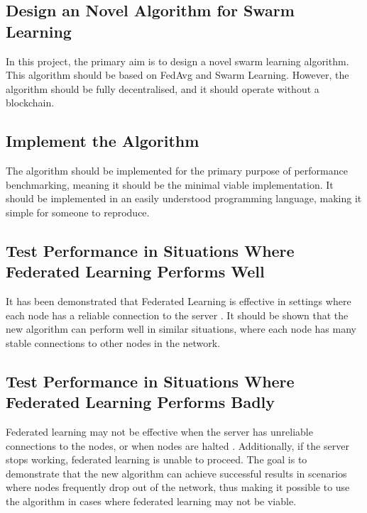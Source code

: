 \subsection{Design an Novel Algorithm for Swarm Learning}
In this project, the primary aim is to design a novel swarm learning algorithm. This algorithm should be based on FedAvg and Swarm Learning. However, the algorithm should be fully decentralised, and it should operate without a blockchain.

\subsection{Implement the Algorithm}
The algorithm should be implemented for the primary purpose of performance benchmarking, meaning it should be the minimal viable implementation. It should be implemented in an easily understood programming language, making it simple for someone to reproduce.

\subsection{Test Performance in Situations Where Federated Learning Performs Well}
It has been demonstrated that Federated Learning is effective in settings where each node has a reliable connection to the server \citeme. It should be shown that the new algorithm can perform well in similar situations, where each node has many stable connections to other nodes in the network.

\subsection{Test Performance in Situations Where Federated Learning Performs Badly}
Federated learning may not be effective when the server has unreliable connections to the nodes, or when nodes are halted \citeme. Additionally, if the server stops working, federated learning is unable to proceed. The goal is to demonstrate that the new algorithm can achieve successful results in scenarios where nodes frequently drop out of the network, thus making it possible to use the algorithm in cases where federated learning may not be viable.